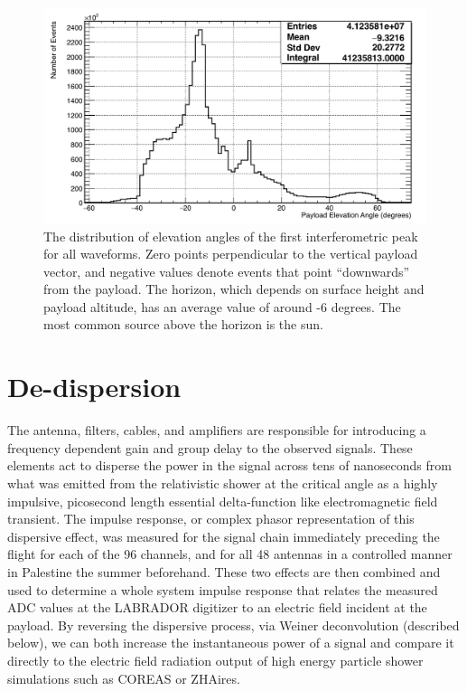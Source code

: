 \begin{figure}
	\centering
	\includegraphics[width=\textwidth]{figures/elevationAngle}
	\caption{The distribution of elevation angles of the first interferometric peak for all waveforms.  Zero points perpendicular to the vertical payload vector, and negative values denote events that point ``downwards'' from the payload.  The horizon, which depends on surface height and payload altitude, has an average value of around -6 degrees.  The most common source above the horizon is the sun.} 
	\label{fig:elevationAngle}
\end{figure}	 
		


\section{De-dispersion}%
	The antenna, filters, cables, and amplifiers are responsible for introducing a frequency dependent gain and group delay to the observed signals.  These elements act to disperse the power in the signal across tens of nanoseconds from what was emitted from the relativistic shower at the critical angle as a highly impulsive, picosecond length essential delta-function like electromagnetic field transient.  The impulse response, or complex phasor representation of this dispersive effect, was measured for the signal chain immediately preceding the flight for each of the 96 channels, and for all 48 antennas in a controlled manner in Palestine the summer beforehand.  These two effects are then combined and used to determine a whole system impulse response that relates the measured ADC values at the LABRADOR digitizer to an electric field incident at the payload.  By reversing the dispersive process, via Weiner deconvolution (described below), we can both increase the instantaneous power of a signal and compare it directly to the electric field radiation output of high energy particle shower simulations such as COREAS or ZHAires.



